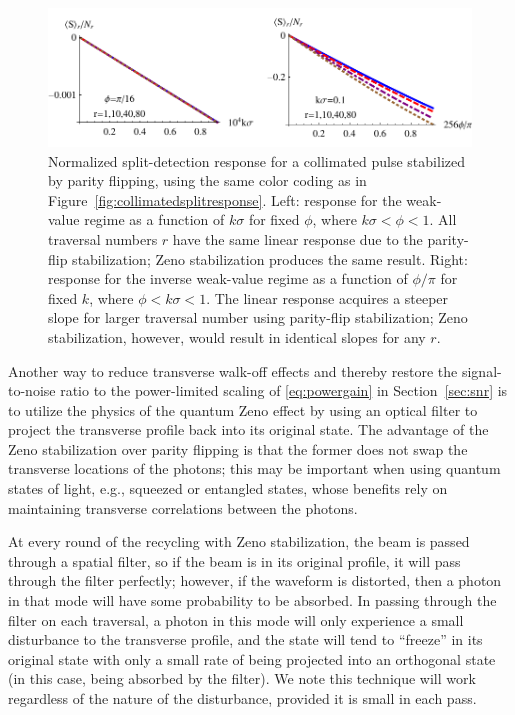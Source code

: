 \begin{figure}[t]
  \begin{center}
    \centerline{\includegraphics[width=6in]{PulsedRecycling/Figures/responseplot-flip.pdf}}
  \end{center}
  \caption[Linear detector response using parity flipping with recycling.]{Normalized split-detection response for a collimated pulse stabilized by parity flipping, using the same color coding as in Figure~\ref{fig:collimatedsplitresponse}.  Left: response for the weak-value regime as a function of $k\sigma$ for fixed $\phi$, where $k\sigma < \phi < 1$.  All traversal numbers $r$ have the same linear response due to the parity-flip stabilization; Zeno stabilization produces the same result.  Right: response for the inverse weak-value regime as a function of $\phi / \pi$ for fixed $k$, where $\phi < k\sigma < 1$.  The linear response acquires a steeper slope for larger traversal number using parity-flip stabilization; Zeno stabilization, however, would result in identical slopes for any $r$. }
  \label{fig:collimatedsplitresponseflip}
\end{figure}
Another way to reduce transverse walk-off effects and thereby restore the signal-to-noise ratio to the power-limited scaling of \eqref{eq:powergain} in Section~\ref{sec:snr} is to utilize the physics of the quantum Zeno effect by using an optical filter to project the transverse profile back into its original state.  The advantage of the Zeno stabilization over parity flipping is that the former does not swap the transverse locations of the photons; this may be important when using quantum states of light, e.g., squeezed or entangled states, whose benefits rely on maintaining transverse correlations between the photons.

At every round of the recycling with Zeno stabilization, the beam is passed through a spatial filter, so if the beam is in its original profile, it will pass through the filter perfectly; however, if the waveform is distorted, then a photon in that mode will have some probability to be absorbed.  In passing through the filter on each traversal, a photon in this mode will only experience a small disturbance to the transverse profile, and the state will tend to ``freeze'' in its original state with only a small rate of being projected into an orthogonal state (in this case, being absorbed by the filter).  We note this technique will work regardless of the nature of the disturbance, provided it is small in each pass.  

